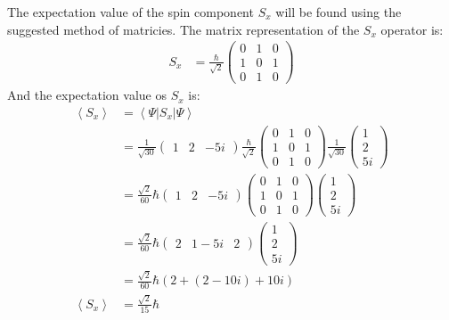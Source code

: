 \documentclass[a4paper,12pt]{article}
\begin{document}
The expectation value of the spin component $S_x$ will be found using the suggested method of matricies.  The matrix representation of the $S_x$ operator is:
\begin{align*}
S_x&=\frac{\hbar}{\sqrt{2}}\begin{pmatrix}
0 & 1 & 0\\
1 & 0 & 1\\
0 & 1 & 0
\end{pmatrix}
\end{align*}
And the expectation value os $S_x$ is:
\begin{align*}
\left<S_x\right>&=\left<\Psi\right|S_x\left|\Psi\right>\\
&=\frac{1}{\sqrt{30}}\begin{pmatrix}
1 & 2 & -5i
\end{pmatrix}\frac{\hbar}{\sqrt{2}}\begin{pmatrix}
0 & 1 & 0\\
1 & 0 & 1\\
0 & 1 & 0
\end{pmatrix}\frac{1}{\sqrt{30}}\begin{pmatrix}
1\\
2\\
5i
\end{pmatrix}\\
&=\frac{\sqrt{2}}{60}\hbar\begin{pmatrix}
1 & 2 & -5i
\end{pmatrix}\begin{pmatrix}
0 & 1 & 0\\
1 & 0 & 1\\
0 & 1 & 0
\end{pmatrix}\begin{pmatrix}
1\\
2\\
5i
\end{pmatrix}\\
&=\frac{\sqrt{2}}{60}\hbar\begin{pmatrix}
2 & 1-5i & 2
\end{pmatrix}\begin{pmatrix}
1\\
2\\
5i
\end{pmatrix}\\
&=\frac{\sqrt{2}}{60}\hbar(2+(2-10i)+10i)\\
\left<S_x\right>&=\frac{\sqrt{2}}{15}\hbar
\end{align*}
\pagebreak
\end{document}
